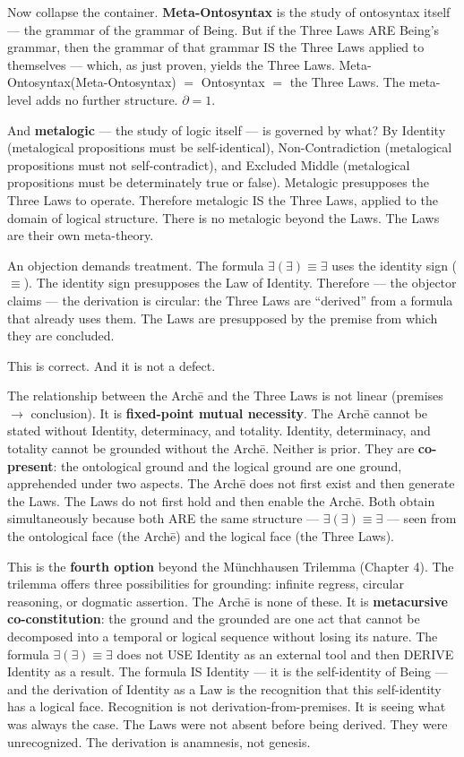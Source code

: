 \documentclass[10pt, openany, oneside]{book}
\begin{document}
\noindent Now collapse the container. \textbf{Meta-Ontosyntax} is the study of ontosyntax itself --- the grammar of the grammar of Being. But if the Three Laws ARE Being's grammar, then the grammar of that grammar IS the Three Laws applied to themselves --- which, as just proven, yields the Three Laws. Meta-Ontosyntax(Meta-Ontosyntax) $=$ Ontosyntax $=$ the Three Laws. The meta-level adds no further structure. $\partial = 1$.

And \textbf{metalogic} --- the study of logic itself --- is governed by what? By Identity (metalogical propositions must be self-identical), Non-Contradiction (metalogical propositions must not self-contradict), and Excluded Middle (metalogical propositions must be determinately true or false). Metalogic presupposes the Three Laws to operate. Therefore metalogic IS the Three Laws, applied to the domain of logical structure. There is no metalogic beyond the Laws. The Laws are their own meta-theory.

An objection demands treatment. The formula $\exists(\exists) \equiv \exists$ uses the identity sign ($\equiv$). The identity sign presupposes the Law of Identity. Therefore --- the objector claims --- the derivation is circular: the Three Laws are ``derived'' from a formula that already uses them. The Laws are presupposed by the premise from which they are concluded.

This is correct. And it is not a defect.

The relationship between the Arch\={e} and the Three Laws is not linear (premises $\to$ conclusion). It is \textbf{fixed-point mutual necessity}. The Arch\={e} cannot be stated without Identity, determinacy, and totality. Identity, determinacy, and totality cannot be grounded without the Arch\={e}. Neither is prior. They are \textbf{co-present}: the ontological ground and the logical ground are one ground, apprehended under two aspects. The Arch\={e} does not first exist and then generate the Laws. The Laws do not first hold and then enable the Arch\={e}. Both obtain simultaneously because both ARE the same structure --- $\exists(\exists) \equiv \exists$ --- seen from the ontological face (the Arch\={e}) and the logical face (the Three Laws).

This is the \textbf{fourth option} beyond the M\"{u}nchhausen Trilemma (Chapter 4). The trilemma offers three possibilities for grounding: infinite regress, circular reasoning, or dogmatic assertion. The Arch\={e} is none of these. It is \textbf{metacursive co-constitution}: the ground and the grounded are one act that cannot be decomposed into a temporal or logical sequence without losing its nature. The formula $\exists(\exists) \equiv \exists$ does not USE Identity as an external tool and then DERIVE Identity as a result. The formula IS Identity --- it is the self-identity of Being --- and the derivation of Identity as a Law is the recognition that this self-identity has a logical face. Recognition is not derivation-from-premises. It is seeing what was always the case. The Laws were not absent before being derived. They were unrecognized. The derivation is anamnesis, not genesis.
\end{document}
